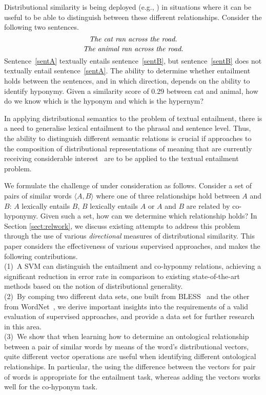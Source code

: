\documentclass[11pt]{article}
\begin{document}
Distributional similarity is being deployed (e.g., ) in situations where it can be useful to be able to distinguish between these different relationships. Consider the following two sentences.
\begin{equation}
\label{sentA}
\mbox{\em The cat ran across the road.}
\end{equation}
\begin{equation}
\label{sentB}
\mbox{\em The animal ran across the road.}
\end{equation}
Sentence~\ref{sentA} textually entails sentence~\ref{sentB}, but sentence~\ref{sentB} does not textually entail sentence~\ref{sentA}. The ability to determine whether entailment holds between the sentences, and in which direction, depends on the ability to identify hyponymy.   Given a similarity score of 0.29 between cat and animal, how do we know which is the hyponym and which is the hypernym? 

In applying distributional semantics to the problem of textual entailment, there is a need to generalise lexical entailment to the phrasal and sentence level. Thus, the ability to distinguish different semantic relations is crucial if approaches to the composition of distributional representations of meaning that are currently receiving considerable interest~\cite{Widdows:08,Mitchell:08,Baroni2010,Grefenstette:11,Socher:12} are to be applied to the textual entailment problem.

We formulate the challenge of under consideration as follows. Consider a set of pairs of similar words $\langle A,B\rangle$ where one of three relationships hold between $A$ and $B$: $A$ lexically entails $B$, $B$ lexically entails $A$ or  $A$ and $B$ are related by co-hyponymy. Given such a set, how can we determine which relationship holds? In Section \ref{sect:relwork}, we discuss existing attempts to address this problem through the use of various \emph{directional} measures of distributional similarity.  This paper  considers the effectiveness of various supervised approaches, and makes the following contributions.\\[2pt]
(1)~A SVM can distinguish the entailment and co-hyponmy relations, achieving a significant reduction in error rate in comparison to  existing state-of-the-art methods based on the notion of distributional generality.\\[2pt]
(2)~By comping two  different data sets, one built from  BLESS~\cite{Baroni2011} and the other from WordNet~\cite{Fellbaum:98}, we derive important insights into the requirements of a valid evaluation of supervised approaches, and provide a data set for further research in this area.\\[2pt]
(3)~We show that when learning how to determine an ontological relationship between a pair of similar words by means of the word's distributional vectors, quite different vector operations are useful when identifying different ontological relationships. In particular, the using the difference between the vectors for pair of words is appropriate for the entailment task, whereas adding the vectors works well for the co-hyponym task.
\end{document}
